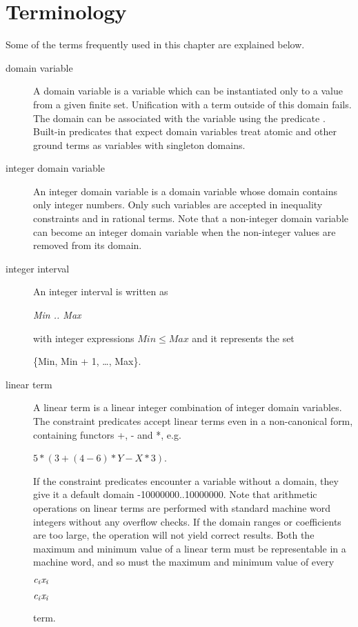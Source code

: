 \section{Terminology}
Some of the terms frequently used in this chapter are explained below.
\begin{description}
\item[domain variable]
A domain variable is a variable which can be instantiated only
to a value from a given finite set.
Unification with a term outside of this domain fails.
The domain can be associated with the variable using the predicate 
.
Built-in predicates that expect domain variables
treat atomic and other ground terms as variables with singleton domains.

\item[integer domain variable]
An integer domain variable is a domain variable
whose domain contains only integer numbers.
Only such variables are accepted in inequality constraints
and in rational terms.
Note that a non-integer domain variable can become
an integer domain variable when the non-integer values
are removed from its domain.

\item[integer interval]
An integer interval is written as
\begin{center}
{\it Min .. Max}
\end{center}
with integer expressions
{\it $Min \leq Max$}
and it represents
the set
\begin{center}
\{Min, Min + 1, \ldots, Max\}.
\end{center}

\item[linear term]
A linear term is a linear integer combination of integer domain variables.
The constraint predicates accept linear terms even in a non-canonical form,
containing functors +, - and *,
e.g.\
\begin{center}
$5*(3+(4-6)*Y-X*3)$.
\end{center}
If the constraint predicates encounter 
a variable without a domain, they
give it a default domain -10000000..10000000.
Note that arithmetic operations on linear terms are performed
with standard machine word integers without any overflow checks.
If the domain ranges or coefficients are too large,
the operation will not yield correct results.
Both the maximum and minimum value of a linear term must
be representable in a machine word, and so must
the maximum and minimum value of every
\begin{latexonly}
\enableunderscores
${\it c_i x_i}$
\disableunderscores
\end{latexonly}
\begin{htmlonly}
${\it c_i x_i}$
\end{htmlonly}
term.


\end{description}

